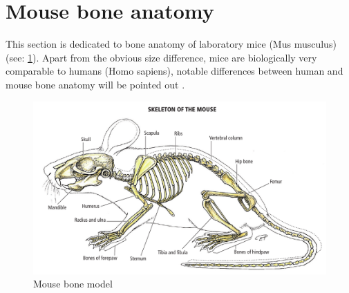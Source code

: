 \section{Mouse bone anatomy}\label{s:b-mouse-anatomy}
This section is dedicated to bone anatomy of laboratory mice (Mus musculus) (see: \cref{fig:mouseFull}).
Apart from the obvious size difference, mice are biologically very comparable to humans (Homo sapiens),
notable differences between human and mouse bone anatomy will be pointed out \cite{ruberteBridgingMouseHuman2023}.
\begin{figure}[h]
	\centerline{
		\includegraphics[scale=0.5]{images/mouseFull.png}}
	\caption{Mouse bone model \cite{ruberteBridgingMouseHuman2023}}\label{fig:mouseFull}
\end{figure}



